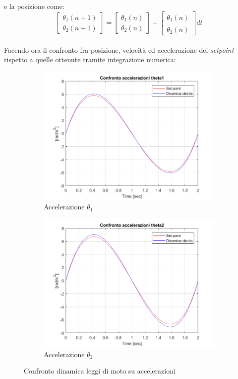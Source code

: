 e la posizione come:
\begin{equation*}
	\begin{bmatrix}
		{\theta}_1 (n+1) \\ {\theta}_2(n+1)
	\end{bmatrix} = \begin{bmatrix}
		{\theta}_1 (n) \\ {\theta}_2(n)
	\end{bmatrix} + \begin{bmatrix}
		\dot{\theta}_1 (n) \\ \dot{\theta}_2(n)
	\end{bmatrix}dt
\end{equation*}
\\Facendo ora il confronto fra posizione, velocità ed accelerazione dei \textit{setpoint} rispetto a quelle ottenute tramite integrazione numerica:
\begin{figure}[!ht]
\begin{subfigure}{.45\textwidth}
  \centering
  \includegraphics[width=.78\linewidth]{Immagini/Dinamica/confracct1new.png}  
  \caption{Accelerazione $\theta_1$}
  \label{fig:sub-first}
\end{subfigure}
\begin{subfigure}{.45\textwidth}
  \centering
  \includegraphics[width=.78\linewidth]{Immagini/Dinamica/confracct2new.png}  
  \caption{Accelerazione $\theta_2$}
  \label{fig:sub-second}
\end{subfigure}
\caption{Confronto dinamica leggi di moto su accelerazioni}
\end{figure}
